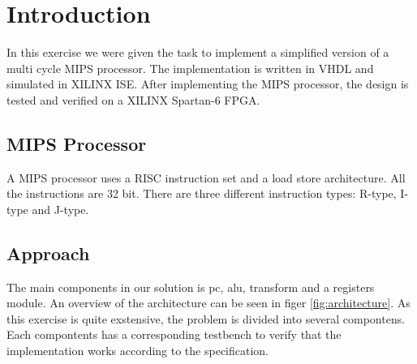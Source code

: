 \chapter{Introduction}
In this exercise we were given the task to implement a simplified version of a multi cycle MIPS processor.
The implementation is written in VHDL and simulated in XILINX ISE.
After implementing the MIPS processor, the design is tested and verified on a XILINX Spartan-6 FPGA.

\section{MIPS Processor}
A MIPS processor uses a RISC instruction set and a load store architecture.
All the instructions are 32 bit.
There are three different instruction types: R-type, I-type and J-type.

\section{Approach}
The main components in our solution is \gls{pc}, \gls{alu}, transform and a registers module.
An overview of the architecture can be seen in figer \ref{fig:architecture}.
As this exercise is quite exstensive, the problem is divided into several compontens.
Each compontents has a corresponding testbench to verify that the implementation works according to the specification.
